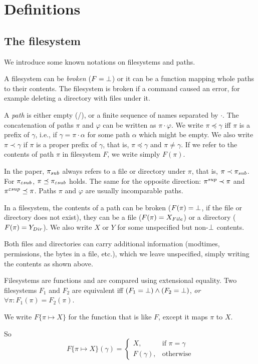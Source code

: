 \section{Definitions}
\label{theorem:def}
\subsection{The filesystem}
We introduce some known notations on filesystems and paths.

A filesystem can be \emph{broken} (\(F=\bot\))
or it can be a function mapping whole paths to their
contents. The filesystem is broken if a command caused an error, for
example deleting a directory with files under it.

A \emph{path} is either empty (/), or a finite sequence of names
separated by \(\cdot\). The concatenation of paths \(\pi\) and
\(\varphi\) can be written as \(\pi\cdot\varphi\).
We write
\(\pi\preceq\gamma\) iff \(\pi\) is a prefix of \(\gamma\), i.e., if
\(\gamma=\pi\cdot\alpha\) for some path \(\alpha\) which might be
empty. We also write
\(\pi\prec\gamma\) if \(\pi\) is a proper prefix of \(\gamma\), that is,
\(\pi\preceq\gamma\) and \(\pi\ne\gamma\). If we refer to the contents of
path \(\pi\) in filesystem \(F\), we write simply \(F(\pi)\).

In the paper, \(\pi_{sub}\) always refers to a file or directory under
\(\pi\), that is, \(\pi\prec\pi_{sub}\). For \(\pi_{\varepsilon sub}\),
\(\pi\preceq\pi_{\varepsilon sub}\) holds. The same for the opposite direction:
\(\pi^{sup}\prec\pi\) and \(\pi^{\varepsilon sup}\preceq\pi\). Paths \(\pi\) and
\(\varphi\) are usually incomparable paths.

In a filesystem, the contents of a path can be broken (\(F(\pi)=\bot\),
if the file or directory does not exist), they can be
a file (\(F(\pi)=X_{File}\)) or a directory (\(F(\pi)=Y_{Dir}\)).  
We also write \(X\) or \(Y\) for some unspecified but non-\(\bot\)
contents.
\begin{notrsi} 
Both files and directories can carry additional information
(modtimes, permissions, the bytes in a file, etc.), which we leave
unspecified, simply writing the contents as shown above.
\end{notrsi}

Filesystems are functions and are compared using extensional equality.
Two filesystems \(F_1\) and \(F_2\) are equivalent iff
\((F_1=\bot)\wedge(F_2=\bot)\),
\emph{or} \(\forall\pi: F_1(\pi)=F_2(\pi)\).

We write \(F\{\pi \mapsto X\}\) for the function that is like \(F\),
except it maps \(\pi\) to \(X\).
\begin{notrsi}
So
\[F\{\pi \mapsto X\}(\gamma)=
\begin{cases}
X,&\mbox{if $\pi=\gamma$}\\
F(\gamma), &\mbox{otherwise}
\end{cases}\]
\end{notrsi}

